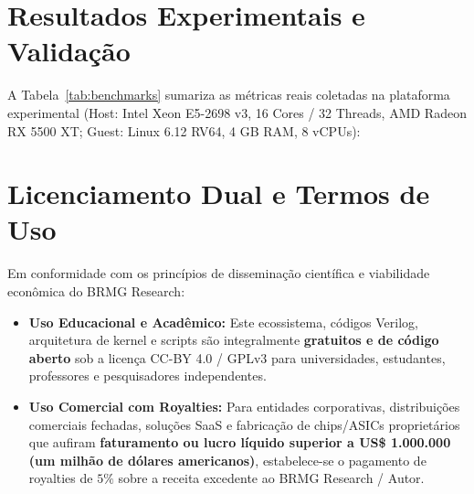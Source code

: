 \documentclass[10pt,twocolumn]{article}
\begin{document}
\section{Resultados Experimentais e Valida\c{c}\~ao}

A Tabela~\ref{tab:benchmarks} sumariza as m\'etricas reais coletadas na plataforma experimental (Host: Intel Xeon E5-2698 v3, 16 Cores / 32 Threads, AMD Radeon RX 5500 XT; Guest: Linux 6.12 RV64, 4 GB RAM, 8 vCPUs):

\begin{table}[htbp]
\centering
\caption{M\'etricas Experimentais do Ecossistema RISC-V}
\label{tab:benchmarks}
\end{table}

\section{Licenciamento Dual e Termos de Uso}

Em conformidade com os princ\'ipios de dissemina\c{c}\~ao cient\'ifica e viabilidade econ\^omica do BRMG Research:
\begin{itemize}
    \item \textbf{Uso Educacional e Acad\^emico:} Este ecossistema, c\'odigos Verilog, arquitetura de kernel e scripts s\~ao integralmente \textbf{gratuitos e de c\'odigo aberto} sob a licen\c{c}a CC-BY 4.0 / GPLv3 para universidades, estudantes, professores e pesquisadores independentes.
    \item \textbf{Uso Comercial com Royalties:} Para entidades corporativas, distribui\c{c}\~oes comerciais fechadas, solu\c{c}\~oes SaaS e fabrica\c{c}\~ao de chips/ASICs propriet\'arios que aufiram \textbf{faturamento ou lucro l\'iquido superior a US\$ 1.000.000 (um milh\~ao de d\'olares americanos)}, estabelece-se o pagamento de royalties de $5\%$ sobre a receita excedente ao BRMG Research / Autor.
\end{itemize}
\end{document}
